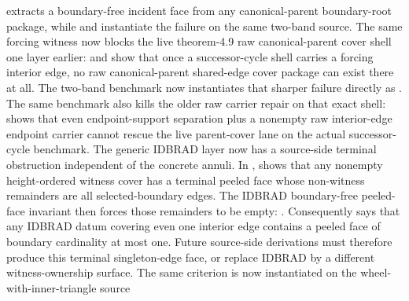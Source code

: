 \documentclass[11pt]{article}
\begin{document}
\begin{itemize}
extracts a boundary-free incident face from any canonical-parent boundary-root
package, while
and
instantiate the failure on the same two-band source.
The same forcing witness now blocks the live theorem-4.9 raw canonical-parent
cover shell one layer earlier:
and
show that once a successor-cycle shell carries a forcing interior edge, no raw
canonical-parent shared-edge cover package can exist there at all.
The two-band benchmark now instantiates that sharper failure directly as
.
The same benchmark also kills the older raw carrier repair on that exact
shell:
shows that even endpoint-support separation plus a nonempty raw interior-edge
endpoint carrier cannot rescue the live parent-cover lane on the actual
successor-cycle benchmark.
The generic IDBRAD layer now has a source-side terminal obstruction independent
of the concrete annuli.  In ,
shows that any nonempty height-ordered witness cover has a terminal peeled face
whose non-witness remainders are all selected-boundary edges.  The IDBRAD
boundary-free peeled-face invariant then forces those remainders to be empty:
.
Consequently
says that any IDBRAD datum covering even one interior edge contains a peeled
face of boundary cardinality at most one.  Future source-side derivations must
therefore produce this terminal singleton-edge face, or replace IDBRAD by a
different witness-ownership surface.
The same criterion is now instantiated on the wheel-with-inner-triangle source

\end{itemize}
\end{document}
